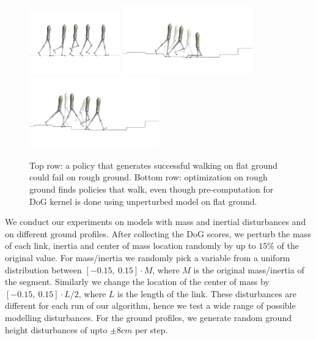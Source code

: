 \begin{figure}[t]
\centering
\includegraphics[width=0.35\textwidth]{img/walk_flat.png}
\hspace{10px}
\vspace{-40px}
\includegraphics[width=0.5\textwidth]{img/rough_fall.png}
\label{fig_bo_locomotion_visualization_rough}
\vspace{30px}
\includegraphics[width=0.5\textwidth]{img/rough_walk.png}
\caption{Top row: a policy that generates successful walking on flat ground could fail on rough ground. Bottom row: optimization on rough ground finds policies that walk, even though pre-computation for DoG kernel is done using unperturbed model on flat ground.}
\label{fig_bo_locomotion_visualization_flat}
\end{figure}

We conduct our experiments on models with mass and inertial disturbances and on different ground profiles. After collecting the DoG scores, we perturb the mass of each link, inertia and center of mass location randomly by up to $15\%$ of the original value. For mass/inertia we randomly pick a variable from a uniform distribution between $[-0.15,\ 0.15] \cdot M$, where $M$ is the original mass/inertia of the segment. Similarly we change the location of the center of mass by $[-0.15,\ 0.15] \cdot L/2$, where $L$ is the length of the link. These disturbances are different for each run of our algorithm, hence we test a wide range of possible modelling disturbances.
For the ground profiles, we generate random ground height disturbances of upto $\pm 8cm$ per step.

